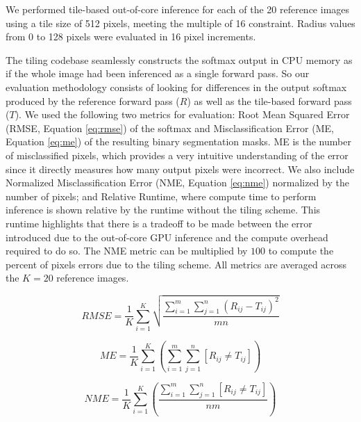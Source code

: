 \documentclass[runningheads]{llncs}
\begin{document}
We performed tile-based out-of-core inference for each of the 20 reference images using a tile size of 512 pixels, meeting the multiple of 16 constraint. Radius values from 0 to 128 pixels were evaluated in 16 pixel increments. 

The tiling codebase seamlessly constructs the softmax output in CPU memory as if the whole image had been inferenced as a single forward pass. So our evaluation methodology consists of looking for differences in the output softmax produced by the reference forward pass ($R$) as well as the tile-based forward pass ($T$). We used the following two metrics for evaluation: Root Mean Squared Error (RMSE, Equation \ref{eq:rmse}) of the softmax and Misclassification Error (ME, Equation \ref{eq:me}) of the resulting binary segmentation masks. ME is the number of misclassified pixels, which provides a very intuitive understanding of the error since it directly measures how many output pixels were incorrect. We also include Normalized Misclassification Error (NME, Equation \ref{eq:nme}) normalized by the number of pixels; and Relative Runtime, where compute time to perform inference is shown relative by the runtime without the tiling scheme. This runtime highlights that there is a tradeoff to be made between the error introduced due to the out-of-core GPU inference and the compute overhead required to do so. The NME metric can be multiplied by $100$ to compute the percent of pixels errors due to the tiling scheme.
All metrics are averaged across the $K = 20$ reference images.

\begin{equation}
RMSE = \frac{1}{K} \sum_{i=1}^{K} \sqrt{ \frac{\sum_{i = 1}^{m} \sum_{j = 1}^{n} (R_{ij} - T_{ij})^2}{mn}}
\label{eq:rmse}
\end{equation}

\begin{equation}
ME = \frac{1}{K} \sum_{i=1}^{K} \left( \sum_{i = 1}^{m} \sum_{j = 1}^{n} [ R_{ij} \neq T_{ij} ] \right) 
\label{eq:me}
\end{equation}

\begin{equation}
NME = \frac{1}{K} \sum_{i=1}^{K} \left( \frac{\sum_{i = 1}^{m} \sum_{j = 1}^{n} [ R_{ij} \neq T_{ij} ]}{nm} \right) 
\label{eq:nme}
\end{equation}
\end{document}
